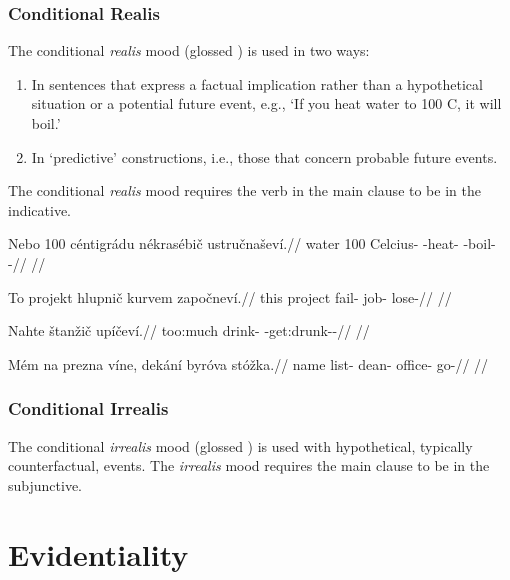 \subsubsection{Conditional Realis}

\par The conditional \textit{realis} mood (glossed ) is used in two ways:
\begin{enumerate}
	\item In sentences that express a factual implication rather than a hypothetical situation or a potential future event, e.g., `If you heat water to 100 C, it will boil.'
	\item In `predictive' constructions, i.e., those that concern probable future events.
\end{enumerate}

The conditional \emph{realis} mood requires the verb in the main clause to be in the indicative.


\pex
\begingl
\gla Nebo 100 céntigrádu nékrasébič ustručnaševí.//
\glb water 100 Celcius-\Ins{} \Caus{}-heat- \Refl{}-boil-\Av{}-\Cont{}//
\glft {}//
\endgl
\xe

\pex
\begingl
\gla To projekt hlupnič kurvem započneví.//
\glb this project fail- job-\First{}\Sg{} lose-//
\glft {}//
\endgl
\xe

\pex
\begingl
\gla Nahte štanžič upíčeví.//
\glb too:much drink- \Refl{}-get:drunk-\Av{}-\Cont{}//
\glft {}//
\endgl
\xe

\pex
\begingl
\gla Mém na prezna víne, dekání byróva stóžka.//
\glb name \Loc{} list-\Acc{}  dean-\Gen{} office-\Acc{} go-//
\glft {}//
\endgl
\xe

\subsubsection{Conditional Irrealis}
The conditional \textit{irrealis} mood (glossed ) is used with hypothetical, typically counterfactual, events. The \emph{irrealis} mood requires the main clause to be in the subjunctive.

\section{Evidentiality}\label{sec:quotative}

